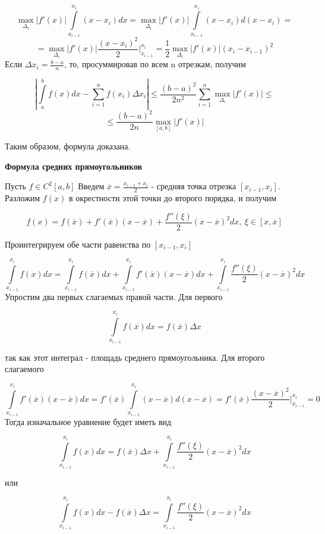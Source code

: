\documentclass{beamer}
\begin{document}
	\[ \max_{\Delta_i} |f'(x)| \int\limits_{x_{i-1}}^{x_i} (x - x_i)dx = \max_{\Delta_i} |f'(x)| \int\limits_{x_{i-1}}^{x_i} (x - x_i)d(x - x_i) = \]
	\[ = \max_{\Delta_i} |f'(x)| \frac{(x-x_i)^2}{2} \Bigg|_{x_{i-1}}^{x_i} = \frac{1}{2} \max_{\Delta_i} |f'(x)| (x_i - x_{i-1})^2 \]
	\newpage
	Если $ \Delta x_i = \frac{b-a}{n}$, то, просуммировав по всем n отрезкам, получим
	
	\[ \left| \int\limits_{a}^{b} f(x)dx - \sum_{i=1}^{n} f(x_i) \Delta x_i \right| \leq \frac{(b-a)^2}{2n^2} \sum_{i=1}^{n} \max_{\Delta_i}|f'(x)| \leq\]\[\leq \frac{(b-a)^2}{2n} \max_{[a, b]}|f'(x)|\]
	
	Таким образом, формула доказана.
	
	\newpage
	
	\textbf{Формула средних прямоугольников}
	
	Пусть $f \in C^2[a, b]$
	Введем $\overline{x} = \frac{x_{i-1} + x_i}{2}$ - средняя точка отрезка $[x_{i-1}, x_i]$. Разложим $f(x)$ в окрестности этой точки до второго порядка, и получим
	
	\[ f(x) = f(\overline{x}) + f'(\overline{x})(x - \overline{x}) + \frac{f''(\xi)}{2} (x - \overline{x})^2 dx, \ \xi \in [x, \overline{x}]\]
	
	Проинтегрируем обе части равенства по $[x_{i-1}, x_i]$
	
	\[ \int\limits_{x_{i-1}}^{x_i} f(x)dx = \int\limits_{x_{i-1}}^{x_i} f(\overline{x})dx + \int\limits_{x_{i-1}}^{x_i} f'(\overline{x})(x - \overline{x})dx + \int\limits_{x_{i-1}}^{x_i} \frac{f''(\xi)}{2} (x - \overline{x})^2 dx\]
	\newpage
	Упростим два первых слагаемых правой части. Для первого
	
	\[ \int\limits_{x_{i-1}}^{x_i} f(\overline{x})dx = f(\overline{x}) \Delta x\]
	
	так как этот интеграл - площадь среднего прямоугольника. Для второго слагаемого
	
	\[ \int\limits_{x_{i-1}}^{x_i} f'(\overline{x})(x - \overline{x})dx = f'(\overline{x})  \int\limits_{x_{i-1}}^{x_i} (x - \overline{x})d(x - \overline{x}) = f'(\overline{x}) \frac{(x - \overline{x})^2}{2} \Bigg|_{x_{i-1}}^{x_i} = 0 \]
	\newpage
	Тогда изначальное уравнение будет иметь вид 
	
	\[ \int\limits_{x_{i-1}}^{x_i} f(x)dx =  f(\overline{x}) \Delta x + \int\limits_{x_{i-1}}^{x_i} \frac{f''(\xi)}{2} (x - \overline{x})^2 dx\]
	
	или
	
	\[ \int\limits_{x_{i-1}}^{x_i} f(x)dx - f(\overline{x}) \Delta x = \int\limits_{x_{i-1}}^{x_i} \frac{f''(\xi)}{2} (x - \overline{x})^2 dx\]
	
\end{document}
